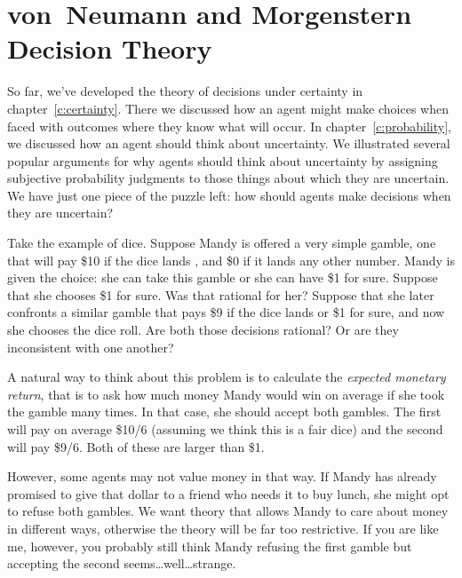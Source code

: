 \chapter[von Neumann\breakslash Morgenstern]{von~Neumann and Morgenstern Decision Theory}
\label{c:vnm}




So far, we've developed the theory of decisions under certainty in chapter~\ref{c:certainty}.  There we discussed how an agent might make choices when faced with outcomes where they know what will occur.  In chapter~\ref{c:probability}, we discussed how an agent should think about uncertainty.  We illustrated several popular arguments for why agents should think about uncertainty by assigning subjective probability judgments to those things about which they are uncertain.  We have just one piece of the puzzle left: how should agents make decisions when they are uncertain?

Take the example of dice.  Suppose Mandy is offered a very simple gamble, one that will pay \$10 if the dice lands , and \$0 if it lands any other number. Mandy is given the choice: she can take this gamble or she can have \$1 for sure.  Suppose that she chooses \$1 for sure.  Was that rational for her? Suppose that she later confronts a similar gamble that pays \$9 if the dice lands  or \$1 for sure, and now she chooses the dice roll. Are both those decisions rational?  Or are they inconsistent with one another?

A natural way to think about this problem is to calculate the {\it expected monetary return}, that is to ask how much money Mandy would win on average if she took the gamble many times.  In that case, she should accept both gambles.  The first will pay on average \$10/6 (assuming we think this is a fair dice) and the second will pay \$9/6.  Both of these are larger than \$1.  

However, some agents may not value money in that way.  If Mandy has already promised to give that dollar to a friend who needs it to buy lunch, she might opt to refuse both gambles.  We want theory that allows Mandy to care about money in different ways, otherwise the theory will be far too restrictive.  If you are like me, however, you probably still think Mandy refusing the first gamble but accepting the second seems\dots well\dots strange.

